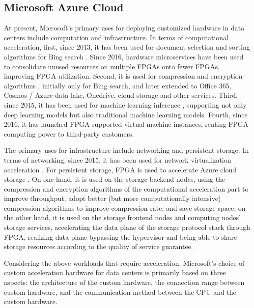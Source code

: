 \subsection{Microsoft Azure Cloud}

At present, Microsoft's primary uses for deploying customized hardware in data centers include computation and infrastructure. In terms of computational acceleration, first, since 2013, it has been used for document selection and sorting algorithms for Bing search \cite{putnam2014reconfigurable}. Since 2016, hardware microservices have been used to consolidate unused resources on multiple FPGAs onto fewer FPGAs, improving FPGA utilization. Second, it is used for compression and encryption algorithms \cite{a-scalable-high-bandwidth-architecture-for-lossless-compression-on-fpgas}, initially only for Bing search, and later extended to Office 365, Cosmos / Azure data lake, Onedrive, cloud storage and other services. Third, since 2015, it has been used for machine learning inference \cite{accelerating-deep-convolutional-neural-networks-using-specialized-hardware,toward-accelerating-deep-learning-scale-using-specialized-hardware-datacenter,serving-dnns-real-time-datacenter-scale-project-brainwave,a-configurable-cloud-scale-dnn-processor-for-real-time-ai}, supporting not only deep learning models but also traditional machine learning models. Fourth, since 2016, it has launched FPGA-supported virtual machine instances, renting FPGA computing power to third-party customers.

The primary uses for infrastructure include networking and persistent storage. In terms of networking, since 2015, it has been used for network virtualization acceleration \cite{smartnic}. For persistent storage, FPGA is used to accelerate Azure cloud storage \cite{calder2011windows}. On one hand, it is used on the storage backend nodes, using the compression and encryption algorithms of the computational acceleration part to improve throughput, adopt better (but more computationally intensive) compression algorithms to improve compression rate, and save storage space; on the other hand, it is used on the storage frontend nodes and computing nodes' storage services, accelerating the data plane of the storage protocol stack through FPGA, realizing data plane bypassing the hypervisor and being able to share storage resources according to the quality of service guarantee.

Considering the above workloads that require acceleration, Microsoft's choice of custom acceleration hardware for data centers is primarily based on three aspects: the architecture of the custom hardware, the connection range between custom hardware, and the communication method between the CPU and the custom hardware.

